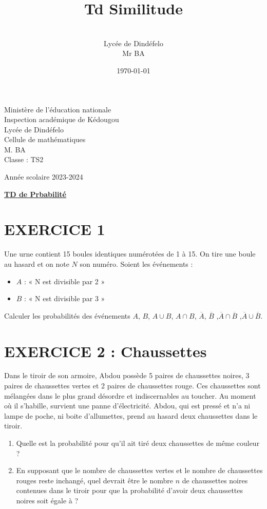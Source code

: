 \documentclass[12pt]{article}
\author{\\Lycée de Dindéfelo\\Mr BA}
\title{\textbf{Td Similitude}}
\date{\today}
\begin{document}
\begin{minipage}{0.5\textwidth}
	Ministère de l'éducation nationale  \\
	Inspection académique de Kédougou   \\
	Lycée de Dindéfelo            \\
	Cellule de mathématiques            \\
	M. BA                          \\
	Classe : TS2  \\
\end{minipage}
\begin{minipage}{0.5\textwidth}
	Année scolaire 2023-2024 \\
\end{minipage}

\begin{center}
	\textbf{{\underline{TD de Prbabilité}}}
\end{center}
\section*{EXERCICE 1}
Une urne contient 15 boules identiques numérotées de 1 à 15. On tire une boule au hasard et on note $N$ son numéro. Soient les événements :
\begin{itemize}
   \item $A$ : « N est divisible par 2 »
   \item $B$ : « N est divisible par 3 »
\end{itemize}
Calculer les probabilités des événements $A$, $B$, $A \cup B$, $A \cap B$, $\overline{A}$, $\overline{B}$ ,$\overline{A} \cap \overline{B}$ ,$\overline{A} \cup \overline{B}$.

\section*{EXERCICE 2 : Chaussettes}
Dans le tiroir de son armoire, Abdou possède 5 paires de chaussettes noires, 3 paires de chaussettes vertes et 2 paires de chaussettes rouge. Ces chaussettes sont mélangées dans le plus grand désordre et indiscernables au toucher.
Au moment où il s’habille, survient une panne d’électricité. Abdou, qui est pressé et n’a ni lampe de poche, ni boite d’allumettes, prend au hasard deux chaussettes dans le tiroir.
\begin{enumerate}
    \item Quelle est la probabilité pour qu’il ait tiré deux chaussettes de même couleur ?
    \item En supposant que le nombre de chaussettes vertes et le nombre de chaussettes rouges reste inchangé, quel devrait être le nombre $n$ de chaussettes noires contenues dans le tiroir pour que la probabilité d’avoir deux chaussettes noires soit égale à ?
\end{enumerate}
\end{document}

